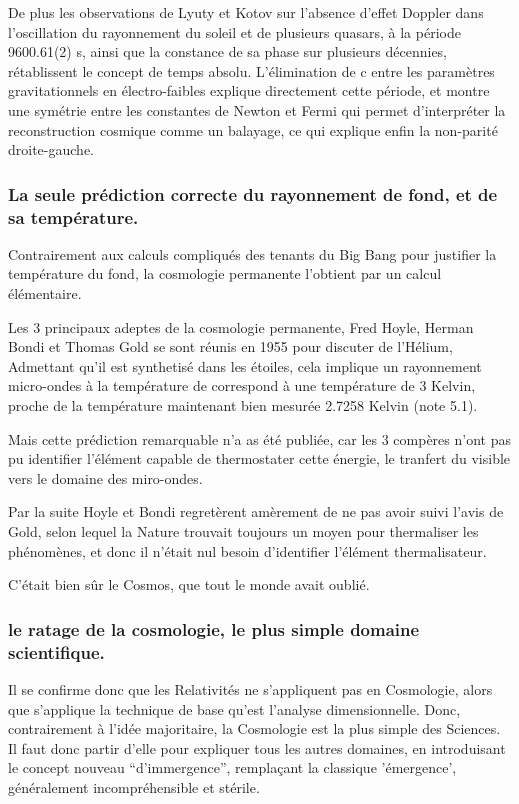 \documentclass[a4paper,12pt]{article}
\begin{document}
 
   De plus les observations de Lyuty et Kotov sur l'absence d'effet Doppler dans l'oscillation du rayonnement du soleil et de plusieurs quasars, à la période 9600.61(2) s, ainsi que la constance de sa phase sur plusieurs décennies, rétablissent le concept de temps absolu. L'élimination de c entre les paramètres gravitationnels en électro-faibles explique directement cette période, et montre une symétrie entre les constantes de Newton et Fermi qui permet d'interpréter la reconstruction cosmique comme un balayage, ce qui explique enfin la non-parité droite-gauche.


\subsubsection{La seule prédiction correcte du rayonnement de fond, et de sa température.}

Contrairement aux calculs compliqués des tenants du Big Bang pour justifier la température du fond, la cosmologie permanente l'obtient par un calcul élémentaire.

   Les 3 principaux adeptes de la cosmologie permanente, Fred Hoyle, Herman Bondi et Thomas Gold se sont réunis en 1955 pour discuter de l'Hélium, Admettant qu'il est synthetisé dans les étoiles, cela implique un rayonnement micro-ondes à la température de correspond à une température de 3 Kelvin, proche de la température maintenant bien mesurée  2.7258   Kelvin (note 5.1).

Mais cette prédiction remarquable n'a as été publiée, car les 3 compères n'ont pas pu identifier l'élément capable de thermostater cette énergie, le tranfert du  visible vers le domaine des miro-ondes. 

Par la suite Hoyle et Bondi regretèrent amèrement de ne pas avoir suivi l'avis de Gold, selon lequel la Nature trouvait toujours un moyen pour thermaliser les phénomènes, et donc il n'était nul besoin d'identifier l'élément thermalisateur.

C'était bien sûr le Cosmos, que tout le monde avait oublié. 
    

\subsubsection{le ratage de la cosmologie, le plus simple domaine scientifique.}


 Il se confirme donc que les Relativités ne s'appliquent pas en Cosmologie, alors que s'applique la technique de base qu'est l'analyse dimensionnelle. Donc, contrairement à l'idée majoritaire, la Cosmologie est la plus simple des Sciences. Il faut donc partir d'elle pour expliquer tous les autres domaines, en introduisant le concept nouveau ``d'immergence'', remplaçant la classique 'émergence', généralement incompréhensible et stérile. 
\end{document}

